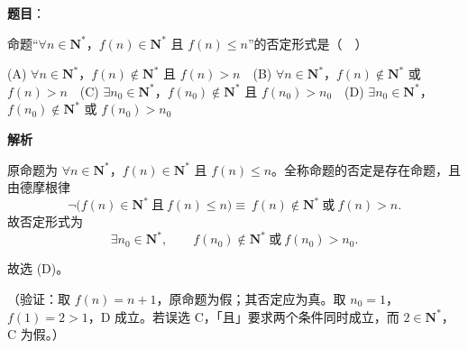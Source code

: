 \begin{answer}

\textbf{题目}：

命题“\(\forall n\in\mathbf{N}^*\)，\(f(n)\in\mathbf{N}^*\) 且 \(f(n)\leqslant n\)”的否定形式是（　）

(A) \(\forall n\in\mathbf{N}^*\)，\(f(n)\notin\mathbf{N}^*\) 且 \(f(n)>n\)　(B) \(\forall n\in\mathbf{N}^*\)，\(f(n)\notin\mathbf{N}^*\) 或 \(f(n)>n\)　(C) \(\exists n_0\in\mathbf{N}^*\)，\(f(n_0)\notin\mathbf{N}^*\) 且 \(f(n_0)>n_0\)　(D) \(\exists n_0\in\mathbf{N}^*\)，\(f(n_0)\notin\mathbf{N}^*\) 或 \(f(n_0)>n_0\)

\textbf{解析}

原命题为 \(\forall n\in\mathbf{N}^*\)，\(f(n)\in\mathbf{N}^*\) 且 \(f(n)\leqslant n\)。全称命题的否定是存在命题，且由德摩根律
\nopagebreak[4]
\[
\neg\bigl(f(n)\in\mathbf{N}^*\ \text{且}\ f(n)\leqslant n\bigr)
\equiv\ f(n)\notin\mathbf{N}^*\ \text{或}\ f(n)>n.
\]
故否定形式为
\nopagebreak[4]
\[
\exists n_0\in\mathbf{N}^*,\qquad f(n_0)\notin\mathbf{N}^*\ \text{或}\ f(n_0)>n_0.
\]

故选 (D)。

（验证：取 \(f(n)=n+1\)，原命题为假；其否定应为真。取 \(n_0=1\)，\(f(1)=2>1\)，D 成立。若误选 C，「且」要求两个条件同时成立，而 \(2\in\mathbf{N}^*\)，C 为假。）


\end{answer}
